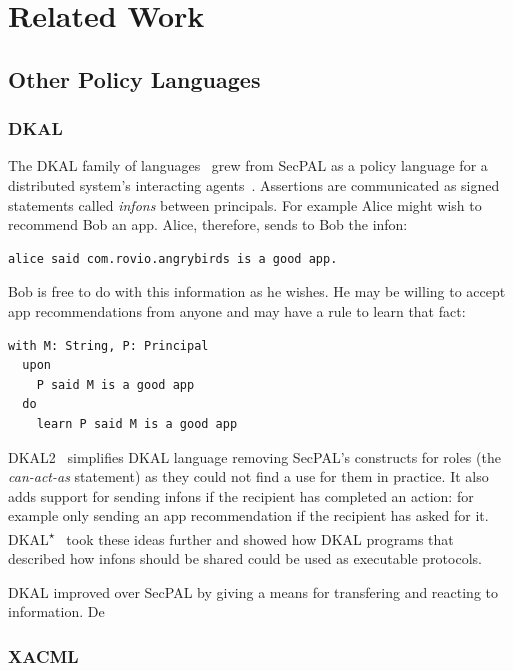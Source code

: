 \documentclass[thesis.tex]{subfiles}
\begin{document}
    \chapter{Related Work}
    \label{chap:related-work}
   
\section{Other Policy Languages}

\subsection{DKAL}

The DKAL family of
languages~\cite{jeannin_dkal*:_2013,gurevich_dkal:_2008,yuri_gurevich_dkal2---simplified_2009}
grew from SecPAL as a policy language for a distributed
system's interacting agents~\cite{blass_introduction_2012}. Assertions are
communicated as signed statements called \emph{infons} between principals. For
example Alice might wish to recommend Bob an app. Alice, therefore, sends to Bob
the infon:

\begin{lstlisting}
alice said com.rovio.angrybirds is a good app.
\end{lstlisting}

Bob is free to do with this information as he wishes.  He may be
willing to accept app recommendations from anyone and may have a rule
to learn that fact:

\begin{lstlisting}
with M: String, P: Principal
  upon
    P said M is a good app
  do
    learn P said M is a good app
\end{lstlisting}

DKAL2~\cite{yuri_gurevich_dkal2---simplified_2009} simplifies DKAL
language removing SecPAL's constructs for roles (the \emph{can-act-as} statement)
as they could not find a use for them in practice.  It also adds
support for sending infons if the recipient has completed an action:
for example only sending an app recommendation if the recipient has
asked for it.
DKAL\textsuperscript{$\star$}~\cite{jeannin_dkal*:_2013} took these
ideas further and showed how DKAL programs that described how infons
should be shared could be used as executable protocols.

DKAL improved over SecPAL by giving a means for transfering and reacting to information.
De

\subsection{XACML}
\end{document}

